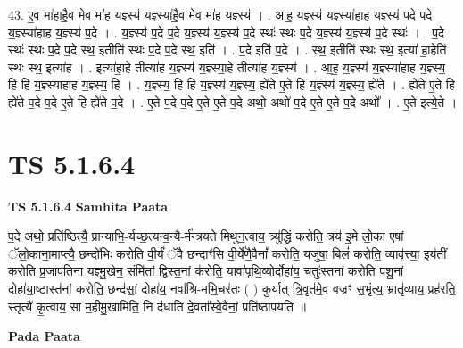 \documentclass[17pt]{extarticle}
\begin{document}
43. ए॒व मा॑हाहै॒व मे॒व मा॑ह य॒ज्ञ्स्य॑ य॒ज्ञ्स्या॑है॒व मे॒व मा॑ह य॒ज्ञ्स्य॑ । . आ॒ह॒ य॒ज्ञ्स्य॑ य॒ज्ञ्स्या॑हाह य॒ज्ञ्स्य॑ प॒दे प॒दे य॒ज्ञ्स्या॑हाह य॒ज्ञ्स्य॑ प॒दे । . य॒ज्ञ्स्य॑ प॒दे प॒दे य॒ज्ञ्स्य॑ य॒ज्ञ्स्य॑ प॒दे स्थः॑ स्थः प॒दे य॒ज्ञ्स्य॑ य॒ज्ञ्स्य॑ प॒दे स्थः॑ । . प॒दे स्थः॑ स्थः प॒दे प॒दे स्थ॒ इतीति॑ स्थः प॒दे प॒दे स्थ॒ इति॑ । . प॒दे इति॑ प॒दे । . स्थ॒ इतीति॑ स्थः स्थ॒ इत्या॑ हा॒हेति॑ स्थः स्थ॒ इत्या॑ह । . इत्या॑हा॒हे तीत्या॑ह य॒ज्ञ्स्य॑ य॒ज्ञ्स्या॒हे तीत्या॑ह य॒ज्ञ्स्य॑ । . आ॒ह॒ य॒ज्ञ्स्य॑ य॒ज्ञ्स्या॑हाह य॒ज्ञ्स्य॒ हि हि य॒ज्ञ्स्या॑हाह य॒ज्ञ्स्य॒ हि । . य॒ज्ञ्स्य॒ हि हि य॒ज्ञ्स्य॑ य॒ज्ञ्स्य॒ ह्ये॑ते ए॒ते हि य॒ज्ञ्स्य॑ य॒ज्ञ्स्य॒ ह्ये॑ते । . ह्ये॑ते ए॒ते हि ह्ये॑ते प॒दे प॒दे ए॒ते हि ह्ये॑ते प॒दे । . ए॒ते प॒दे प॒दे ए॒ते ए॒ते प॒दे अथो॒ अथो॑ प॒दे ए॒ते ए॒ते प॒दे अथो᳚ । . ए॒ते इत्ये॒ते । \newline
\pagebreak
{}

\section{ TS 5.1.6.4 }

\textbf{TS 5.1.6.4 } \newline
\textbf{Samhita Paata} \newline

प॒दे अथो॒ प्रति॑ष्ठित्यै॒ प्रान्याभि॒-र्यच्छ॒त्यन्व॒न्यै-र्म॑न्त्रयते मिथुन॒त्वाय॒ त्र्यु॑द्धिं करोति॒ त्रय॑ इ॒मे लो॒का ए॒षां ॅलो॒काना॒माप्त्यै॒ छन्दो॑भिः करोति वी॒र्यं॑ ॅवै छन्दाꣳ॑सि वी॒र्ये॑णै॒वैनां᳚ करोति॒ यजु॑षा॒ बिलं॑ करोति॒ व्यावृ॑त्त्या॒ इय॑तीं करोति प्र॒जाप॑तिना यज्ञ्मु॒खेन॒ संमि॑तां द्विस्त॒नां क॑रोति॒ यावा॑पृथि॒व्योर्दोहा॑य॒ चतुः॑स्तनां करोति पशू॒नां दोहा॑या॒ष्टास्त॑नां करोति॒ छन्द॑सां॒ दोहा॑य॒ नवा᳚श्रि-मभि॒चर॑तः ( ) कुर्यात् त्रि॒वृत॑मे॒व वज्रꣳ॑ स॒भृंत्य॒ भ्रातृ॑व्याय॒ प्रह॑रति॒ स्तृत्यै॑ कृ॒त्वाय॒ सा म॒हीमु॒खामिति॒ नि द॑धाति दे॒वता᳚स्वे॒वैनां॒ प्रति॑ष्ठापयति ॥ \newline

\textbf{Pada Paata} \newline
\end{document}
